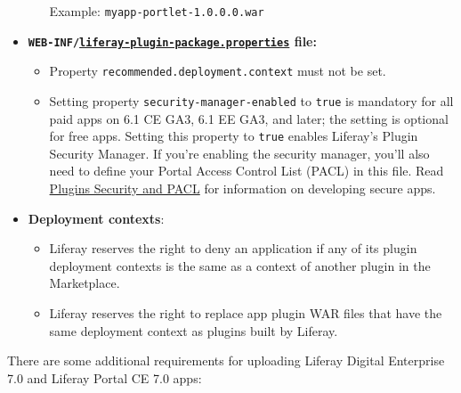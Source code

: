 \begin{itemize}
\begin{itemize}
    Example: \texttt{myapp-portlet-1.0.0.0.war}
  \end{itemize}
\item
  \textbf{\texttt{WEB-INF/}\href{http://docs.liferay.com/portal/6.2/propertiesdoc/liferay-plugin-package_6_2_0.properties.html}{\texttt{liferay-plugin-package.properties}}
  file:}

  \begin{itemize}
  \tightlist
  \item
    Property \texttt{recommended.deployment.context} must not be set.
  \item
    Setting property \texttt{security-manager-enabled} to \texttt{true}
    is mandatory for all paid apps on 6.1 CE GA3, 6.1 EE GA3, and later;
    the setting is optional for free apps. Setting this property to
    \texttt{true} enables Liferay's Plugin Security Manager. If you're
    enabling the security manager, you'll also need to define your
    Portal Access Control List (PACL) in this file. Read
    \href{/docs/6-2/tutorials/-/knowledge_base/t/plugin-security-and-pacl}{Plugins
    Security and PACL} for information on developing secure apps.
  \end{itemize}
\item
  \textbf{Deployment contexts}:

  \begin{itemize}
  \tightlist
  \item
    Liferay reserves the right to deny an application if any of its
    plugin deployment contexts is the same as a context of another
    plugin in the Marketplace.
  \item
    Liferay reserves the right to replace app plugin WAR files that have
    the same deployment context as plugins built by Liferay.
  \end{itemize}
\end{itemize}

There are some additional requirements for uploading Liferay Digital
Enterprise 7.0 and Liferay Portal CE 7.0 apps:

